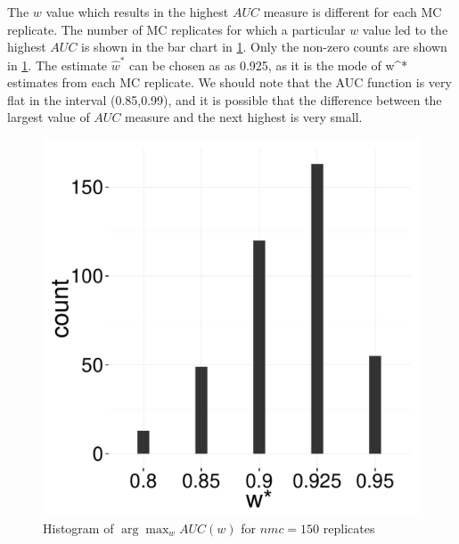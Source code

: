 \documentclass[12pt]{article} %
\begin{document}
  The $w$ value  which results in the highest $AUC$ measure  is different for each MC replicate.  The number of  MC replicates  for  which a particular $w$ value led to the highest $AUC$ is shown in  the bar chart in 	\ref{fig:ArgMaxWAUCW}. Only the non-zero counts are  shown in \ref{fig:ArgMaxWAUCW}. The estimate $\hat{w}^* $ can be chosen as  as 0.925, as it is the mode of w^* estimates from each MC replicate. We should note that the AUC function is very flat in the interval (0.85,0.99), and it is possible that the difference between the largest value of  $AUC$ measure and the next highest is very small.
\begin{figure}[h]
	\centering
	
		\includegraphics[scale=0.15]{auc_argmax_hist.pdf}
	
	\caption{Histogram of $\arg\max_w AUC(w)$ for $nmc=150$ replicates}
	\label{fig:ArgMaxWAUCW}
\end{figure}


\end{document}
